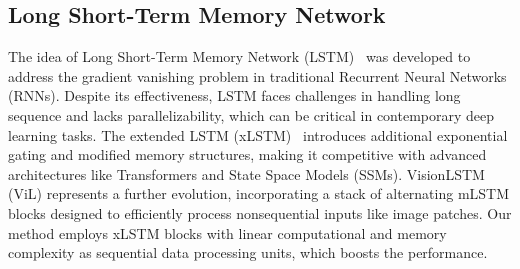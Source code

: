 \subsection{Long Short-Term Memory Network}
The idea of Long Short-Term Memory Network (LSTM)~\cite{hochreiter1997long} was developed to address the gradient vanishing problem in traditional Recurrent Neural Networks (RNNs). 
Despite its effectiveness, LSTM faces challenges in handling long sequence and lacks parallelizability, which can be critical in contemporary deep learning tasks.
The extended LSTM (xLSTM)~\cite{beck2024xlstm} introduces additional exponential gating and modified memory structures, making it competitive with advanced architectures like Transformers and State Space Models (SSMs).
VisionLSTM~\cite{alkin2024visionlstm} (ViL) represents a further evolution, incorporating a stack of alternating mLSTM blocks designed to efficiently process nonsequential inputs like image patches.
Our method employs xLSTM blocks with linear computational and memory complexity as sequential data processing units, which boosts the performance.